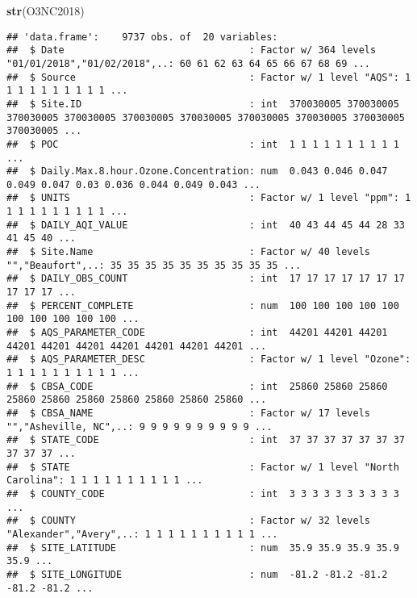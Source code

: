\documentclass[]{article}
\newenvironment{Shaded}{\begin{snugshade}}{\end{snugshade}}
\newcommand{\KeywordTok}[1]{\textcolor[rgb]{0.13,0.29,0.53}{\textbf{#1}}}
\newcommand{\CommentTok}[1]{\textcolor[rgb]{0.56,0.35,0.01}{\textit{#1}}}
\newcommand{\NormalTok}[1]{#1}
\begin{document}
\begin{Shaded}
\begin{Highlighting}[]
\KeywordTok{str}\NormalTok{(O3NC2018)}
\end{Highlighting}
\end{Shaded}

\begin{verbatim}
## 'data.frame':    9737 obs. of  20 variables:
##  $ Date                                : Factor w/ 364 levels "01/01/2018","01/02/2018",..: 60 61 62 63 64 65 66 67 68 69 ...
##  $ Source                              : Factor w/ 1 level "AQS": 1 1 1 1 1 1 1 1 1 1 ...
##  $ Site.ID                             : int  370030005 370030005 370030005 370030005 370030005 370030005 370030005 370030005 370030005 370030005 ...
##  $ POC                                 : int  1 1 1 1 1 1 1 1 1 1 ...
##  $ Daily.Max.8.hour.Ozone.Concentration: num  0.043 0.046 0.047 0.049 0.047 0.03 0.036 0.044 0.049 0.043 ...
##  $ UNITS                               : Factor w/ 1 level "ppm": 1 1 1 1 1 1 1 1 1 1 ...
##  $ DAILY_AQI_VALUE                     : int  40 43 44 45 44 28 33 41 45 40 ...
##  $ Site.Name                           : Factor w/ 40 levels "","Beaufort",..: 35 35 35 35 35 35 35 35 35 35 ...
##  $ DAILY_OBS_COUNT                     : int  17 17 17 17 17 17 17 17 17 17 ...
##  $ PERCENT_COMPLETE                    : num  100 100 100 100 100 100 100 100 100 100 ...
##  $ AQS_PARAMETER_CODE                  : int  44201 44201 44201 44201 44201 44201 44201 44201 44201 44201 ...
##  $ AQS_PARAMETER_DESC                  : Factor w/ 1 level "Ozone": 1 1 1 1 1 1 1 1 1 1 ...
##  $ CBSA_CODE                           : int  25860 25860 25860 25860 25860 25860 25860 25860 25860 25860 ...
##  $ CBSA_NAME                           : Factor w/ 17 levels "","Asheville, NC",..: 9 9 9 9 9 9 9 9 9 9 ...
##  $ STATE_CODE                          : int  37 37 37 37 37 37 37 37 37 37 ...
##  $ STATE                               : Factor w/ 1 level "North Carolina": 1 1 1 1 1 1 1 1 1 1 ...
##  $ COUNTY_CODE                         : int  3 3 3 3 3 3 3 3 3 3 ...
##  $ COUNTY                              : Factor w/ 32 levels "Alexander","Avery",..: 1 1 1 1 1 1 1 1 1 1 ...
##  $ SITE_LATITUDE                       : num  35.9 35.9 35.9 35.9 35.9 ...
##  $ SITE_LONGITUDE                      : num  -81.2 -81.2 -81.2 -81.2 -81.2 ...
\end{verbatim}

\begin{Shaded}
\end{Shaded}
\end{document}
